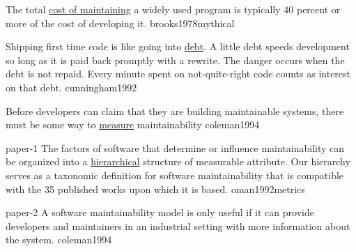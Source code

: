 \documentclass{article}
\begin{document}


  {The total \ul{cost of maintaining} a widely used program is typically 40 percent or more of the cost of developing it.}
  {brooks1978mythical}

  {Shipping first time code is like going into \ul{debt}. A little debt speeds development so long as it is paid back promptly with a rewrite. The danger occurs when the debt is not repaid. Every minute spent on not-quite-right code counts as interest on that debt.}
  {cunningham1992}

  {Before developers can claim that they are building maintainable systems, there must be some way to \ul{measure} maintainability}
  {coleman1994}

\lnQuote
  {paper-1}
  {The factors of software that determine or influence maintainability can be organized into a \ul{hierarchical} structure of measurable attribute. Our hierarchy serves as a taxonomic definition for software maintainability that is compatible with the 35 published works upon which it is based.}
  {oman1992metrics}



\lnQuote
  {paper-2}
  {A software maintainability model is only useful if it can provide developers and maintainers in an industrial setting with more information about the system.}
  {coleman1994}
\end{document}
